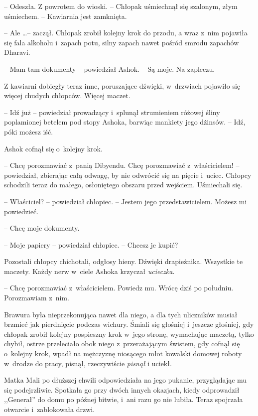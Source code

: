 \documentclass[oneside,polish,11pt,rmheadings]{mwbk}
\begin{document}
-- Odeszła. Z powrotem do wioski. -- Chłopak uśmiechnął się szalonym, złym uśmiechem. -- Kawiarnia jest zamknięta.

-- Ale \ldots  -- zaczął. Chłopak zrobił kolejny krok do przodu, a wraz z~nim pojawiła się fala alkoholu i~zapach potu, silny zapach nawet pośród smrodu zapachów Dharavi. 

-- Mam tam dokumenty -- powiedział Ashok. -- Są moje. Na zapleczu.

Z kawiarni dobiegły teraz inne, poruszające dźwięki, w~drzwiach pojawiło się więcej chudych chłopców. Więcej maczet. 

-- Idź już -- powiedział prowadzący i~splunął strumieniem różowej śliny poplamionej betelem pod stopy Ashoka, barwiąc mankiety jego dżinsów. -- Idź, póki możesz iść. 

Ashok cofnął się o~kolejny krok. 

-- Chcę porozmawiać z~panią Dibyendu. Chcę porozmawiać z~właścicielem! -- powiedział, zbierając całą odwagę, by nie odwrócić się na pięcie i~uciec. Chłopcy schodzili teraz do małego, osłoniętego obszaru przed wejściem. Uśmiechali się.

-- Właściciel? -- powiedział chłopiec. -- Jestem jego przedstawicielem. Możesz mi powiedzieć.

-- Chcę moje dokumenty.

-- Moje papiery -- powiedział chłopiec. -- Chcesz je kupić?

Pozostali chłopcy chichotali, odgłosy hieny. Dźwięki drapieżnika. Wszystkie te maczety. Każdy nerw w~ciele Ashoka krzyczał \textit{ucieczka}. 

-- Chcę porozmawiać z~właścicielem. Powiedz mu. Wrócę dziś po południu. Porozmawiam z~nim.

Brawura była nieprzekonująca nawet dla niego, a dla tych uliczników musiał brzmieć jak pierdnięcie podczas wichury. Śmiali się głośniej i~jeszcze głośniej, gdy chłopak zrobił kolejny pospieszny krok w~jego stronę, wymachując maczetą, tylko chybił, ostrze przeleciało obok niego z~przerażającym świstem, gdy cofnął się o~kolejny krok, wpadł na mężczyznę niosącego młot kowalski domowej roboty w~drodze do pracy, pisnął, rzeczywiście \textit{pisnął }i uciekł.

Matka Mali po dłuższej chwili odpowiedziała na jego pukanie, przyglądając mu się podejrzliwie. Spotkała go przy dwóch innych okazjach, kiedy odprowadził ,,Generał'' do domu po późnej bitwie, i~ani razu go nie lubiła. Teraz spojrzała otwarcie i~zablokowała drzwi. 
\end{document}
